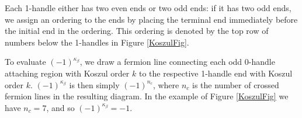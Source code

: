 Each 1-handle either has two even ends or two odd ends: if it has two odd ends, we assign an ordering 
to the ends by placing the terminal end immediately before the initial end in the ordering. This ordering
is denoted by the top row of numbers below the 1-handles in Figure \ref{KoszulFig}. 

To evaluate $(-1)^{\kappa_\beta}$, we draw a fermion line connecting each odd 0-handle attaching region
with Koszul order $k$ to the respective 1-handle end with Koszul order $k$. $(-1)^{\kappa_\beta}$ is then 
simply $(-1)^{n_c}$, where $n_c$ is the number of crossed fermion lines in the resulting diagram. 
In the example of Figure \ref{KoszulFig} we have $n_c=7$, and so $(-1)^{\kappa_\beta}=-1$. 



\kwsep

